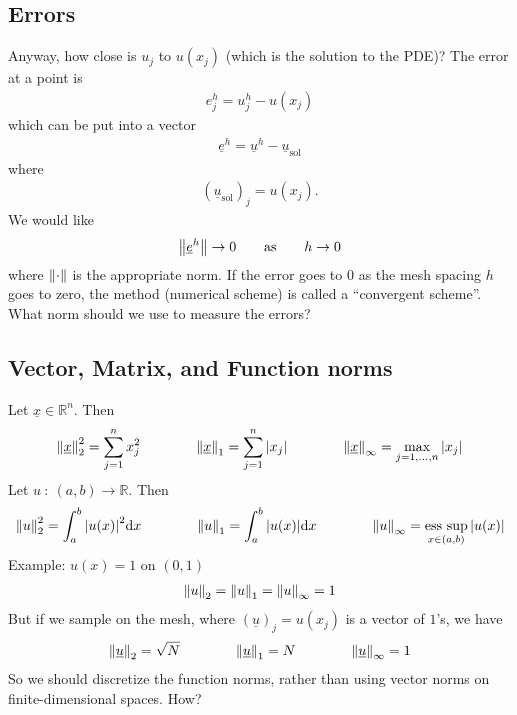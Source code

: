 \documentclass{article}
\newcommand{\Rl}{\mathbb{R}}
\newcommand{\f}[3]{#1\ :\ #2 \rightarrow #3}
\DeclareMathOperator*{\esssup}{\text{ess~sup}}
\begin{document}
        \subsection{Errors}
            Anyway, how close is $u_j$ to $u(x_j)$ (which is the solution to the PDE)?  The error at a point is
            \begin{align}
                e_j^h = u_j^h - u(x_j)
            \end{align}
            which can be put into a vector
            \begin{align}
                \underline{e}^h = \underline{u}^h - \underline{u}_\text{sol}
            \end{align}
            where
            \begin{align}
                (\underline{u}_\text{sol})_j = u(x_j).
            \end{align}
            We would like
            \begin{align}
                \norm{\underline{e}^h} \rightarrow 0 \qquad \text{as} \qquad h \rightarrow 0
            \end{align}
            where $\norm{\cdot}$ is the appropriate norm.  If the error goes to $0$ as the mesh spacing $h$ goes to zero, the method (numerical scheme) is called a ``convergent scheme''.  What norm should we use to measure the errors?
        \subsection{Vector, Matrix, and Function norms}
            Let $\underline{x} \in \Rl^n$.  Then
            \begin{align}
                \norm{\underline{x}}_2^2 = \sum_{j=1}^n x_j^2 \qquad \qquad \norm{\underline{x}}_1 = \sum_{j=1}^n \abs{x_j} \qquad \qquad \norm{\underline{x}}_\infty = \max_{j=1,\dots,n}\abs{x_j}
            \end{align}
            Let $\f{u}{(a,b)}{\Rl}$.  Then
            \begin{align}
                \norm{u}_2^2 = \int_a^b \abs{u(x)}^2\dd x \qquad \qquad \norm{u}_1 = \int_a^b \abs{u(x)}\dd x \qquad \qquad \norm{u}_\infty = \esssup_{x\in(a,b)}\abs{u(x)}
            \end{align}
            Example: $u(x) = 1$ on $(0,1)$
            \begin{align}
                \norm{u}_2 = \norm{u}_1 = \norm{u}_\infty = 1
            \end{align}
            But if we sample on the mesh, where $(\underline{u})_j = u(x_j)$ is a vector of $1$'s, we have
            \begin{align}
                \norm{\underline{u}}_2 = \sqrt{N} \qquad \qquad \norm{\underline{u}}_1 = N \qquad \qquad \norm{\underline{u}}_\infty = 1
            \end{align}
            So we should discretize the function norms, rather than using vector norms on finite-dimensional spaces.  How?
\end{document}
